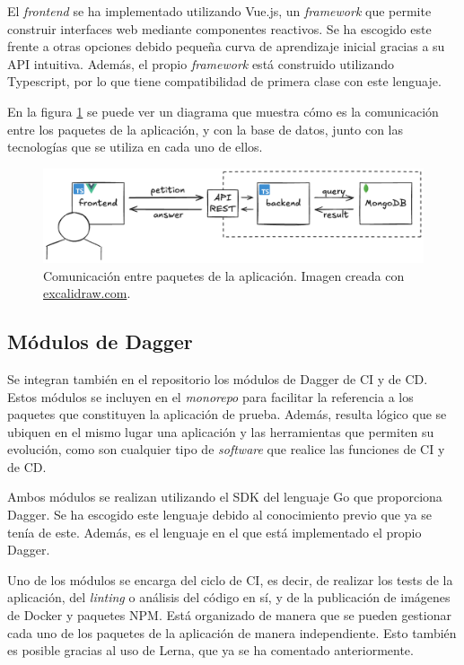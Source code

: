 El \textit{frontend} se ha implementado utilizando Vue.js\cite{vue}, un \textit{framework} que permite construir interfaces web mediante componentes reactivos. Se ha escogido este frente a otras opciones debido pequeña curva de aprendizaje inicial gracias a su API intuitiva. Además, el propio \textit{framework} está construido utilizando Typescript, por lo que tiene compatibilidad de primera clase con este lenguaje.

En la figura \ref{fig:app} se puede ver un diagrama que muestra cómo es la comunicación entre los paquetes de la aplicación, y con la base de datos, junto con las tecnologías que se utiliza en cada uno de ellos.

\begin{figure}
  \centerline{\includegraphics[width=15cm]{figuras/app}}
  \caption{Comunicación entre paquetes de la aplicación. Imagen creada con \href{https://excalidraw.com}{excalidraw.com}.}
  \label{fig:app}
\end{figure}

\subsection*{Módulos de Dagger}

Se integran también en el repositorio los módulos de Dagger de CI y de CD. Estos módulos se incluyen en el \textit{monorepo} para facilitar la referencia a los paquetes que constituyen la aplicación de prueba. Además, resulta lógico que se ubiquen en el mismo lugar una aplicación y las herramientas que permiten su evolución, como son cualquier tipo de \textit{software} que realice las funciones de CI y de CD.

Ambos módulos se realizan utilizando el SDK del lenguaje Go que proporciona Dagger. Se ha escogido este lenguaje debido al conocimiento previo que ya se tenía de este. Además, es el lenguaje en el que está implementado el propio Dagger.

Uno de los módulos se encarga del ciclo de CI, es decir, de realizar los tests de la aplicación, del \textit{linting} o análisis del código en sí, y de la publicación de imágenes de Docker y paquetes NPM. Está organizado de manera que se pueden gestionar cada uno de los paquetes de la aplicación de manera independiente. Esto también es posible gracias al uso de Lerna, que ya se ha comentado anteriormente.

